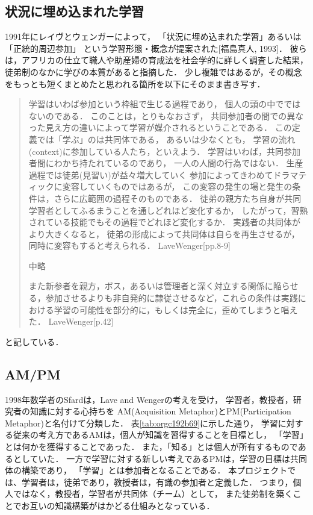 \documentclass{hissymp}
\begin{document}
\subsection{状況に埋め込まれた学習}
\label{sec:org7f5efec}
1991年にレイヴとウェンガーによって，
  「状況に埋め込まれた学習」あるいは「正統的周辺参加」
  という学習形態・概念が提案された[福島真人, 1993]．
  彼らは，アフリカの仕立て職人や助産婦の育成法を社会学的に詳しく調査した結果，
  徒弟制のなかに学びの本質があると指摘した．
少し複雑ではあるが，その概念をもっとも短くまとめたと思われる箇所を以下にそのまま書き写す．
\begin{quote}
学習はいわば参加という枠組で生じる過程であり，
個人の頭の中でではないのである．
このことは，とりもなおさず，
共同参加者の間での異なった見え方の違いによって学習が媒介されるということである．
この定義では「学ぶ」のは共同体である，
あるいは少なくとも，
学習の流れ(context)に参加している人たち，といえよう．
学習はいわば，共同参加者間にわかち持たれているのであり，
一人の人間の行為ではない．
生産過程では徒弟(見習い)が益々増大していく
参加によってきわめてドラマティックに変容していくものではあるが，
この変容の発生の場と発生の条件は，さらに広範囲の過程そのものである．
徒弟の親方たち自身が共同学習者としてふるまうことを通しどれほど変化するか，
したがって，習熟されている技能でもその過程でどれほど変化するか．
実践者の共同体がより大きくなると，
徒弟の形成によって共同体は自らを再生させるが，
同時に変容もすると考えられる．
LaveWenger[pp.8-9]

中略

また新参者を親方，ボス，あるいは管理者と深く対立する関係に陥らせる，参加させるよりも非自発的に隷従させるなど，これらの条件は実践における学習の可能性を部分的に，もしくは完全に，歪めてしまうと唱えた．
 LaveWenger[p.42]
\end{quote}
と記している．


\subsection{AM/PM}
\label{sec:orgc7eca48}
1998年数学者のSfardは，Lave and Wengerの考えを受け，
学習者，教授者，研究者の知識に対する心持ちを
AM(Acquisition Metaphor)とPM(Participation Metaphor)と名付けて分類した．
表\ref{tab:orgc192b69}に示した通り，
学習に対する従来の考え方であるAMは，個人が知識を習得することを目標とし，
「学習」とは何かを獲得することであった．
また，「知る」とは個人が所有するものであるとしていた．
一方で学習に対する新しい考えであるPMは，学習の目標は共同体の構築であり，
「学習」とは参加者となることである．
本プロジェクトでは、学習者は，徒弟であり，教授者は，有識の参加者と定義した．
つまり，個人ではなく，教授者，学習者が共同体（チーム）として，
また徒弟制を築くことでお互いの知識構築がはかどる仕組みとなっている．
\end{document}
